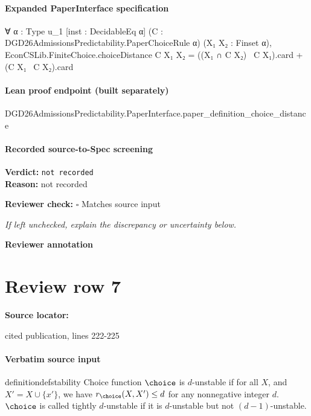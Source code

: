 \documentclass[10pt]{article}
\newcommand{\reviewerbox}{%
  \par\noindent\fbox{\parbox{0.96\linewidth}{\rule{0pt}{0.38in}}}\par
}
\newcommand{\reviewmatch}[1]{%
  \par\noindent\textbf{Reviewer check:} $\square$\; #1\par
  \noindent\emph{If left unchecked, explain the discrepancy or uncertainty below.}\par
}
\begin{document}
\paragraph{Expanded PaperInterface specification}
\begin{ReviewVerbatim}
∀ {α : Type u_1} [inst : DecidableEq α] (C : DGD26AdmissionsPredictability.PaperChoiceRule α) (X₁ X₂ : Finset α),
  EconCSLib.FiniteChoice.choiceDistance C X₁ X₂ = ((X₁ ∩ C X₂) \ C X₁).card + (C X₁ \ C X₂).card
\end{ReviewVerbatim}

\paragraph{Lean proof endpoint (built separately)}\begin{ReviewVerbatim}
DGD26AdmissionsPredictability.PaperInterface.paper_definition_choice_distance
\end{ReviewVerbatim}

\paragraph{Recorded source-to-Spec screening}
\textbf{Verdict:} \texttt{not recorded}
\\
\textbf{Reason:} not recorded
\reviewmatch{Matches source input}
\noindent\textbf{Reviewer annotation}\par
\reviewerbox
\clearpage
\hypertarget{source-claim-398a4d87fcced6ba}{}
\section*{Review row 7}
\textbf{Source locator:} {\footnotesize\raggedright cited publication, lines 222-\allowbreak{}225\par}
\paragraph{Verbatim source input}
\begin{ReviewVerbatim}
\begin{restatable}[$d$-Instability]{definition}{defstability}
\label{def:d-instability}
Choice function $\choice$ is $d$-unstable if for all $X$, and $X' = X \cup \{x'\}$, we have $r_\choice(X, X') \leq d$ for any nonnegative integer $d$. $\choice$ is called tightly $d$-unstable if it is $d$-unstable but not $(d-1)$-unstable.
\end{restatable}
\end{ReviewVerbatim}
\end{document}
